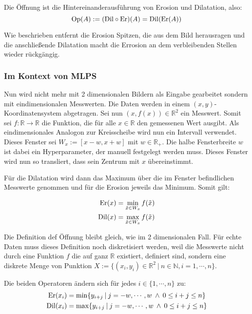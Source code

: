 \documentclass{article}
\newcommand{\R}[0]{\mathbb{R}}
\begin{document}
Die Öffnung ist die Hintereinanderausführung von Erosion und Dilatation, also:
\begin{equation}
    {\rm Op}(A) := ({\rm Dil} \circ {\rm Er})(A) = {\rm Dil}({\rm Er}(A))
\end{equation}

Wie beschrieben entfernt die Erosion Spitzen, die aus dem Bild herausragen und die anschließende Dilatation macht die Errosion an dem verbleibenden Stellen wieder rückgängig.

\subsubsection{Im Kontext von MLPS}

Nun wird nicht mehr mit 2 dimensionalen Bildern als Eingabe gearbeitet sondern mit eindimensionalen Messwerten. Die Daten werden in einem $(x,y)$-Koordinatensystem abgetragen. 
Sei nun $(x,f(x)) \in \R^2$ ein Messwert. Somit sei $f:\R \to \R$ die Funktion, die für alle $x \in \R$ den gemessenen Wert ausgibt. Als eindimensionales Analogon zur Kreisscheibe wird nun ein Intervall verwendet. 
Dieses Fenster sei $W_x := [x-w, x+w]$ mit $w \in \R_+$. Die halbe Fensterbreite $w$ ist dabei ein Hyperparameter, der manuell festgelegt werden muss. 
Dieses Fenster wird nun so transliert, dass sein Zentrum mit $x$ übereinstimmt.

Für die Dilatation wird dann das Maximum über die im Fenster befindlichen Messwerte genommen und für die Erosion jeweils das Minimum. Somit gilt:

\begin{align}
    {\rm Er}(x)  &= \min\limits_{\tilde{x} \in W_x} f(\tilde{x}) \\
    {\rm Dil}(x) &= \max\limits_{\tilde{x} \in W_x} f(\tilde{x})
\end{align}

Die Definition def Öffnung bleibt gleich, wie im 2 dimensionalen Fall.
Für echte Daten muss dieses Definition noch diskretisiert werden, weil die Messwerte nicht durch eine Funktion $f$ die auf ganz $\R$ existiert, definiert sind, sondern eine diskrete Menge von Punktion $X := \{(x_i,y_i) \in \R^2 \: | \: n\in \mathbb{N}, i=1,\cdots,n \}$.

Die beiden Operatoren ändern sich für jedes $i\in \{1,\cdots,n\}$ zu:
\begin{align}
    {\rm Er}(x_i) &= \min \{y_{i+j} \: | \: j=-w,\cdots,w \: \land \: 0 \leq i + j \leq n\} \\
    {\rm Dil}(x_i)  &= \max \{y_{i+j} \: | \: j=-w,\cdots,w \: \land \: 0 \leq i + j \leq n\}
\end{align}
\end{document}
